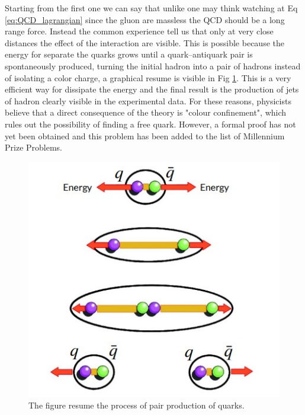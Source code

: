 \documentclass[12pt,a4paper]{book}
\begin{document}
	Starting from the first one we can say that unlike one may think watching at Eq \ref{eq:QCD_lagrangian} since the gluon are massless the QCD should be a long range force. Instead the common experience tell us that only at very close distances the effect of the interaction are visible. This is possible because the energy for separate the quarks grows until a quark–antiquark pair is spontaneously produced, turning the initial hadron into a pair of hadrons instead of isolating a color charge, a graphical resume is visible in Fig \ref{fig:quark_confinement}. This is a very efficient way for dissipate the energy and the final result is the production of jets of hadron clearly visible in the experimental data.  For these reasons, physicists believe that a direct consequence of the theory is "colour confinement", which rules out the possibility of finding a free quark. However, a formal proof has not yet been obtained and this problem has been added to the list of Millennium Prize Problems.
	\begin{figure}		
		\centering
		\includegraphics[width=0.7\linewidth]{pictures/quark_confinement.jpeg}
		\caption{The figure resume the process of pair production of quarks. \cite{modern_physics}}
		\label{fig:quark_confinement} 
	\end{figure}
	
\end{document}
